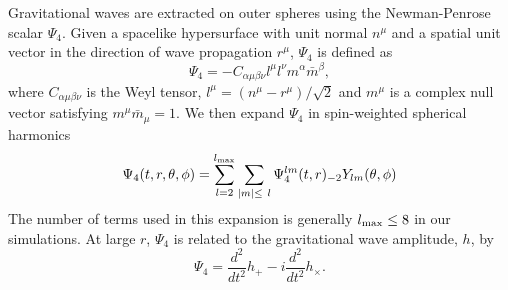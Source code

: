 Gravitational waves are extracted on outer spheres using the Newman-Penrose scalar $\Psi_4$. Given a spacelike
hypersurface with unit normal $n^{\mu}$ and a spatial unit vector in
the direction of wave propagation $r^{\mu}$, $\Psi_4$ is defined as 
\begin{equation}
\Psi_4 = -C_{\alpha\mu\beta\nu}l^{\mu}l^{\nu}m^{\alpha}\bar{m}^{\beta},
\end{equation}
where $C_{\alpha\mu\beta\nu}$ is the Weyl tensor,
$l^{\mu}=\left(n^{\mu}-r^{\mu}\right)/\sqrt{2}$ and $m^{\mu}$ is a
complex null vector satisfying $m^{\mu}\bar{m}_{\mu}=1$. We then expand
$\Psi_4$ in spin-weighted spherical harmonics
\begin{equation}
\Psi_4(t,r,\theta,\phi)=\sum_{l=2}^{l_{\rm max}}\sum_{|m|\leq~l}{\Psi_4^{lm}(t,r)_{-2}Y_{lm}(\theta,\phi)}
\end{equation}
The number of terms used in this expansion is generally $l_{\rm max}\leq 8$ in
our simulations. At large $r$, $\Psi_4$ is related to the
gravitational wave amplitude, $h$, by
\begin{equation}
\Psi_4=\frac{d^2}{dt^2}h_{+}-i\frac{d^2}{dt^2}h_{\times}.
\end{equation}


